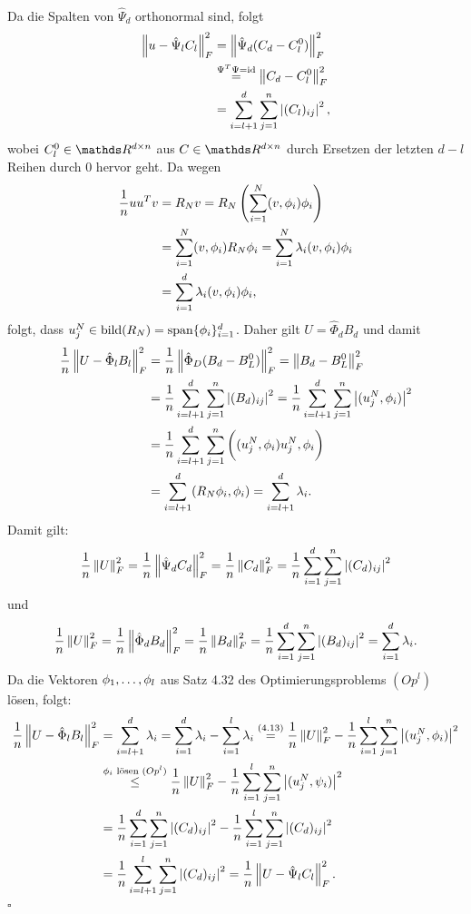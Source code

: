 \\
Da die Spalten von $\hat{\Psi}_d$ orthonormal sind, folgt 
\begin{align*}
\left\Vert u-\hat{\Psi}_lC_l\right\Vert_F^2 &= \left\Vert\hat{\Psi}_d(C_d-C_l^0)\right\Vert_F^2\\
&\stackrel{\Psi^T\Psi=\operatorname{id}}{=} \left\Vert C_d-C_l^0\right\Vert_F^2\\
&= \sum_{i=l+1}^d \sum_{j=1}^n \left\vert(C_l)_{ij}\right\vert^2,
\end{align*}
wobei $C_l^0\in \R^{d\times n}$ aus $C\in \R^{d\times n}$ durch Ersetzen der letzten $d-l$ Reihen durch $0$ hervor geht.
Da wegen
\begin{align*}
\frac{1}{n} uu^Tv &= R_Nv = R_N \left( \sum_{i=1}^{N}(v,\phi_i)\phi_i\right)\\
&= \sum_{i=1}^{N} (v,\phi_i)R_N\phi_i = \sum_{i=1}^N \lambda_i(v,\phi_i)\phi_i\\
&= \sum_{i=1}^d \lambda_i(v,\phi_i)\phi_i,
\end{align*}
folgt, dass $u_j^N\in \operatorname{bild}(R_N)=\operatorname{span} \{\phi_i\}_{i=1}^d$.
Daher gilt $U=\hat{\Phi}_dB_d$ und damit
\begin{align}
\begin{split}
\frac{1}{n} \left\Vert U-\hat{\Phi}_lB_l\right\Vert_F^2 &= \frac{1}{n} \left\Vert\hat{\Phi}_D(B_d-B_L^0)\right\Vert_F^2 = \left\Vert B_d-B_L^0\right\Vert_F^2\\
&= \frac{1}{n} \sum_{i=l+1}^d \sum_{j=1}^n \left\vert(B_d)_{ij}\right\vert^2 = \frac{1}{n} \sum_{i=l+1}^d \sum_{j=1}^n \left\vert(u_j^N,\phi_i)\right\vert^2\\
&= \frac{1}{n} \sum_{i=l+1}^d \sum_{j=1}^n \bigg((u_j^N,\phi_i)u_j^N,\phi_i\bigg)\\
&= \sum_{i=l+1}^d (R_N\phi_i,\phi_i) = \sum_{i=l+1}^d \lambda_i.
\end{split}
\end{align}
Damit gilt:
\[
\frac{1}{n} \left\Vert U\right\Vert_F^2 = \frac{1}{n} \left\Vert\hat{\Psi}_dC_d\right\Vert_F^2 = \frac{1}{n} \left\Vert C_d\right\Vert_F^2 = \frac{1}{n} \sum_{i=1}^d \sum_{j=1}^n \left\vert(C_d)_{ij}\right\vert^2
\]
und
\[
\frac{1}{n} \left\Vert U\right\Vert_F^2 = \frac{1}{n} \left\Vert\hat{\Phi}_dB_d\right\Vert_F^2 = \frac{1}{n} \left\Vert B_d\right\Vert_F^2 = \frac{1}{n} \sum_{i=1}^d \sum_{j=1}^n \left\vert(B_d)_{ij}\right\vert^2 = \sum_{i=1}^d \lambda_i.
\]
Da die Vektoren $\phi_1, \dots ,\phi_l$ aus Satz 4.32 des Optimierungsproblems $(Op^l)$ lösen, folgt:
\begin{align*}
\frac{1}{n} \left\Vert U - \hat{\Phi}_lB_l\right\Vert_F^2 &= \sum_{i=l+1}^{d} \lambda_i = \sum_{i=1}^{d} \lambda_i -\sum_{i=1}^{l} \lambda_i \stackrel{(4.13)}{=} \frac{1}{n} \left\Vert U\right\Vert_F^2 - \frac{1}{n} \sum_{i=1}^{l}\sum_{j=1}^n \left\vert(u_j^N,\phi_i)\right\vert^2\\
&\stackrel{\phi_i \text{ lösen }(Op^l)}{\le} \frac{1}{n} \left\Vert U\right\Vert_F^2 - \frac{1}{n} \sum_{i=1}^{l}\sum_{j=1}^n \left\vert(u_j^N,\psi_i)\right\vert^2\\
&= \frac{1}{n} \sum_{i=1}^{d}\sum_{j=1}^n \left\vert(C_d)_{ij}\right\vert^2 -  \frac{1}{n} \sum_{i=1}^{l}\sum_{j=1}^n \left\vert(C_d)_{ij}\right\vert^2\\
&= \frac{1}{n} \sum_{i=l+1}^{l}\sum_{j=1}^n \left\vert(C_d)_{ij}\right\vert^2 = \frac{1}{n} \left\Vert U-\hat{\Psi}_lC_l\right\Vert_F^2.\\
\end{align*}
\hfill $\square$

